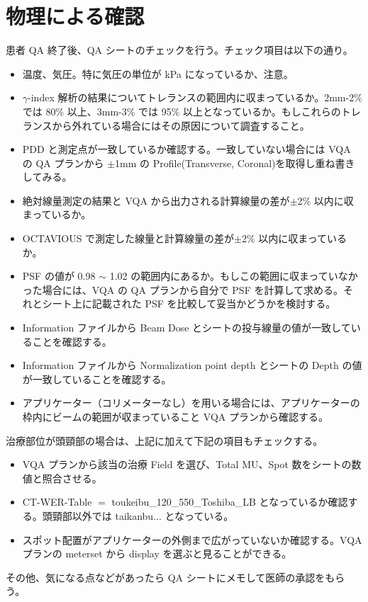 \documentclass[11pt,a4paper]{jsarticle}
\newcommand{\noindot}{\noindent{$\cdot$}} %
\begin{document}
\section{物理による確認}
\noindot 患者 QA 終了後、QA シートのチェックを行う。チェック項目は以下の通り。
	\begin{itemize}
		\item 温度、気圧。特に気圧の単位が kPa になっているか、注意。
		\item $\gamma$-index 解析の結果についてトレランスの範囲内に収まっているか。2mm-2\% では 80\% 以上、3mm-3\% では 95\% 以上となっているか。もしこれらのトレランスから外れている場合にはその原因について調査すること。
		\item PDD と測定点が一致しているか確認する。一致していない場合には VQA の QA プランから $\pm$1mm の Profile(Transverse, Coronal)を取得し重ね書きしてみる。
		\item 絶対線量測定の結果と VQA から出力される計算線量の差が$\pm$2\% 以内に収まっているか。
		\item OCTAVIOUS で測定した線量と計算線量の差が$\pm$2\% 以内に収まっているか。
		\item PSF の値が 0.98 $\sim$ 1.02 の範囲内にあるか。もしこの範囲に収まっていなかった場合には、VQA の QA プランから自分で PSF を計算して求める。それとシート上に記載された PSF を比較して妥当かどうかを検討する。
		\item Information ファイルから Beam Dose とシートの投与線量の値が一致していることを確認する。
		\item Information ファイルから Normalization point depth とシートの Depth の値が一致していることを確認する。
		\item アプリケーター（コリメーターなし）を用いる場合には、アプリケーターの枠内にビームの範囲が収まっていること VQA プランから確認する。
	\end{itemize}%
\noindot 治療部位が頭頸部の場合は、上記に加えて下記の項目もチェックする。
	\begin{itemize}
		\item VQA プランから該当の治療 Field を選び、Total MU、Spot 数をシートの数値と照合させる。
		\item CT-WER-Table $=$ toukeibu\_120\_550\_Toshiba\_LB となっているか確認する。頭頸部以外では taikanbu... となっている。
		\item スポット配置がアプリケーターの外側まで広がっていないか確認する。VQA プランの meterset から display を選ぶと見ることができる。
	\end{itemize}%
\noindot その他、気になる点などがあったら QA シートにメモして医師の承認をもらう。
%	
\end{document}
